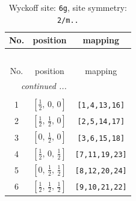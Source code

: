 \documentclass[fleqn,8pt]{jsarticle}
\begin{document}
\renewcommand{\arraystretch}{1.2}
\begin{longtable}{ccc}
\caption{Wyckoff site: {\tt 6g}, site symmetry: {\tt 2/m..}}
 \\
 \hline \hline
No. & position & mapping \\ \hline \endfirsthead

\multicolumn{2}{l}{\tablename\ \thetable{}} \\
 \hline \hline
No. & position & mapping \\ \hline \endhead

 \hline \hline
\multicolumn{2}{r}{\footnotesize\it continued ...} \\ \endfoot

 \hline \hline
\multicolumn{2}{r}{} \\ \endlastfoot

1 & $\left[ \frac{1}{2},\, 0,\, 0 \right]$ & {\tt [1,4,13,16]} \\ \hline
2 & $\left[ \frac{1}{2},\, \frac{1}{2},\, 0 \right]$ & {\tt [2,5,14,17]} \\ \hline
3 & $\left[ 0,\, \frac{1}{2},\, 0 \right]$ & {\tt [3,6,15,18]} \\ \hline
4 & $\left[ \frac{1}{2},\, 0,\, \frac{1}{2} \right]$ & {\tt [7,11,19,23]} \\ \hline
5 & $\left[ 0,\, \frac{1}{2},\, \frac{1}{2} \right]$ & {\tt [8,12,20,24]} \\ \hline
6 & $\left[ \frac{1}{2},\, \frac{1}{2},\, \frac{1}{2} \right]$ & {\tt [9,10,21,22]} \\
\end{longtable}
\renewcommand{\arraystretch}{1.2}
\end{document}
